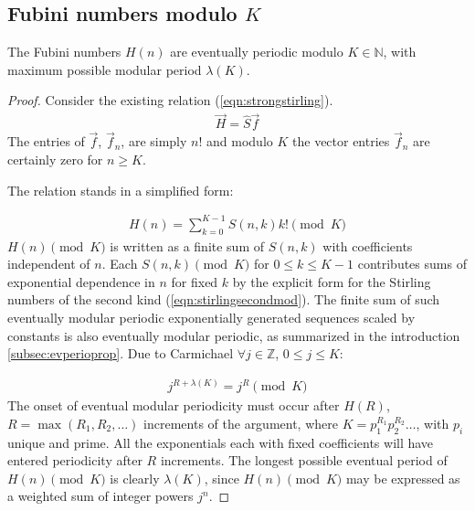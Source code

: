 \documentclass[12pt,reqno]{article}
\begin{document}
\subsection{Fubini numbers modulo $K$}
\begin{theorem}\label{thm:fubinimodk}
	The Fubini numbers $H(n)$ are eventually periodic modulo $K \in \mathbb{N}$, with maximum possible modular period $\lambda(K)$.

	\begin{proof}
		Consider the existing relation (\ref{eqn:strongstirling}).
		\begin{align}
			\vec{H} = \hat{S}\vec{f}\nonumber
		\end{align}
		The entries of $\vec{f}$, $\vec{f}_{n}$, are simply $n!$ and modulo $K$ the vector entries $\vec{f}_{n}$ are certainly zero for $n \geq K$.

		The relation stands in a simplified form:

		\begin{align}
			H(n) = \sum_{k = 0}^{K - 1} S(n,k) k! \pmod {K}\label{eqn:stirlingsecondmod}
		\end{align}
		$H(n)\pmod {K}$ is written as a finite sum of $S(n,k)$ with coefficients independent of $n$. Each $S(n,k) \pmod {K}$ for $0 \leq k \leq K - 1$ contributes sums of exponential dependence in $n$  for fixed $k$ by the explicit form for the Stirling numbers of the second kind (\ref{eqn:stirlingsecondmod}). The finite sum of such eventually modular periodic exponentially generated sequences scaled by constants is also eventually modular periodic, as summarized in the introduction \ref{subsec:evperioprop}. Due to Carmichael $\forall j \in \mathbb{Z}$, $0 \leq j \leq K$:

		\begin{align}
			j^{R + \lambda(K)} = j^{R} \pmod {K}
		\end{align}
		The onset of eventual modular periodicity must occur after $H(R)$, $R = \max(R_{1}, R_{2}, \ldots)$ increments of the argument, where $K = p_{1}^{R_{1}} p_{2}^{R_{2}} \ldots$, with $p_{i}$ unique and prime. All the exponentials each with fixed coefficients will have entered periodicity after $R$ increments. The longest possible eventual period of $H(n) \pmod {K}$ is clearly $\lambda(K)$, since $H(n) \pmod {K}$ may be expressed as a weighted sum of integer powers $j^{n}$.
		
	\end{proof}
\end{theorem}
\end{document}
